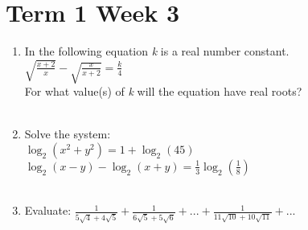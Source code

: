 \documentclass[../main.tex]{subfiles}
\begin{document}
\section*{Term 1 Week 3}
\begin{enumerate}
    \item 
    In the following equation \textit{k} is a real number constant.\\
    
    \(\sqrt{\frac{x+2}{x}}-\sqrt{\frac{x}{x+2}}=\frac{k}{4}\)\\
    
    For what value(s) of \textit{k} will the equation have real roots?\\ \\
    
    \item 
    Solve the system:\\

    \(\log_2(x^2+y^2)=1+\log_2(45)\)\\
    \(\log_2({x-y})-\log_2(x+y)=\frac{1}{3}\log_2(\frac{1}{8})\)\\ \\


    \item 
    Evaluate:
    \(\frac{1}{5\sqrt{4}+4\sqrt{5}}+\frac{1}{6\sqrt{5}+5\sqrt{6}}+...+\frac{1}{11\sqrt{10}+10\sqrt{11}}+... \)
\end{enumerate}
\end{document}
